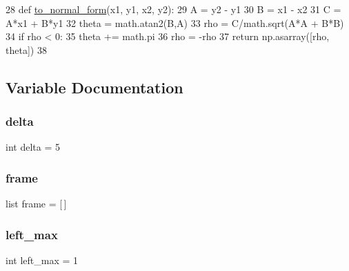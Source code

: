 \begin{DoxyCode}
28 \textcolor{keyword}{def }\mbox{\hyperlink{namespacetoxic__vision_1_1lane__detector_ae3bdbfab97718df7c906f65d19f10dfd}{to\_normal\_form}}(x1, y1, x2, y2):
29     A = y2 - y1
30     B = x1 - x2
31     C = A*x1 + B*y1
32     theta = math.atan2(B,A)
33     rho   = C/math.sqrt(A*A + B*B)
34     \textcolor{keywordflow}{if} rho < 0:
35         theta += math.pi
36         rho = -rho
37     \textcolor{keywordflow}{return} np.asarray([rho, theta])
38 
\end{DoxyCode}


\subsection{Variable Documentation}
\mbox{\label{namespacetoxic__vision_1_1lane__detector_a1dfcb70b9229f2da17dd5922b87ecf2c}} 
\subsubsection{\texorpdfstring{delta}{delta}}
{\footnotesize\ttfamily int delta = 5}

\mbox{\label{namespacetoxic__vision_1_1lane__detector_a9c845a56c4d49b65dea74d4e4f9df6d1}} 
\subsubsection{\texorpdfstring{frame}{frame}}
{\footnotesize\ttfamily list frame = \mbox{[}$\,$\mbox{]}}

\mbox{\label{namespacetoxic__vision_1_1lane__detector_a67e59ed32e1bd6ac26bd569779b86c04}} 
\subsubsection{\texorpdfstring{left\+\_\+max}{left\_max}}
{\footnotesize\ttfamily int left\+\_\+max = 1}

